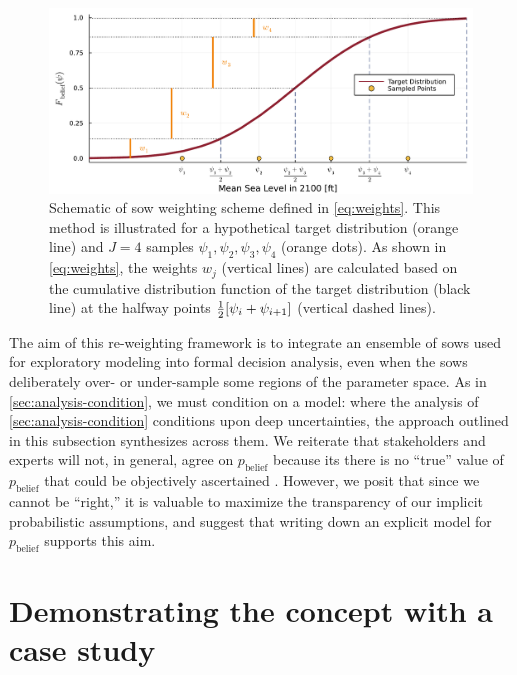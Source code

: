 \documentclass[11pt]{article}
\begin{document}
\begin{figure}
    \centering
    \includegraphics[width=\textwidth]{grid-sketch}
    \caption{
        Schematic of \gls{sow} weighting scheme defined in \cref{eq:weights}.
        This method is illustrated for a hypothetical target distribution (orange line) and $J=4$ samples $\psi_1, \psi_2, \psi_3, \psi_4$ (orange dots).
        As shown in \cref{eq:weights}, the weights $w_j$ (vertical lines) are calculated based on the cumulative distribution function of the target distribution  (black line) at the halfway points $\frac{1}{2}\qty[\psi_i+\psi_{i+1}]$ (vertical dashed lines).
    }\label{fig:grid-sketch}
\end{figure}

The aim of this re-weighting framework is to integrate an ensemble of \glspl{sow} used for exploratory modeling into formal decision analysis, even when the \glspl{sow} deliberately over- or under-sample some regions of the parameter space.
As in \cref{sec:analysis-condition}, we must condition on a model: where the analysis of \cref{sec:analysis-condition} conditions upon deep uncertainties, the approach outlined in this subsection synthesizes across them.
We reiterate that stakeholders and experts will not, in general, agree on $p_\mathrm{belief}$ because its there is no ``true'' value of $p_\mathrm{belief}$ that could be objectively ascertained \citep{oreskes_verification:1994,walker_deep:2013}.
However, we posit that since we cannot be ``right,'' it is valuable to maximize the transparency of our implicit probabilistic assumptions, and suggest that writing down an explicit model for $p_\mathrm{belief}$ supports this aim.

\section{Demonstrating the concept with a case study}\label{sec:case-study}
\end{document}
